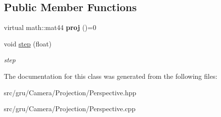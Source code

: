 \subsection*{\-Public \-Member \-Functions}
\begin{DoxyCompactItemize}
\item 
\hypertarget{classglutpp_1_1Camera_1_1Projection_1_1Perspective_ab7b627853146f397299f112e4eb41c5b}{virtual math\-::mat44 {\bfseries proj} ()=0}\label{classglutpp_1_1Camera_1_1Projection_1_1Perspective_ab7b627853146f397299f112e4eb41c5b}

\item 
\hypertarget{classglutpp_1_1Camera_1_1Projection_1_1Perspective_a0ddb1d4c5039ca1e58f3d89680d7bcf7}{void \hyperlink{classglutpp_1_1Camera_1_1Projection_1_1Perspective_a0ddb1d4c5039ca1e58f3d89680d7bcf7}{step} (float)}\label{classglutpp_1_1Camera_1_1Projection_1_1Perspective_a0ddb1d4c5039ca1e58f3d89680d7bcf7}

\begin{DoxyCompactList}\small\item\em step \end{DoxyCompactList}\end{DoxyCompactItemize}


\-The documentation for this class was generated from the following files\-:\begin{DoxyCompactItemize}
\item 
src/gru/\-Camera/\-Projection/\-Perspective.\-hpp\item 
src/gru/\-Camera/\-Projection/\-Perspective.\-cpp\end{DoxyCompactItemize}

